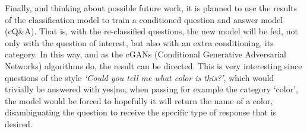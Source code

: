 Finally, and thinking about possible future work, it is planned to use the results of the classification model to train a conditioned question and answer model (cQ\&A). That is, with the re-classified questions, the new model will be fed, not only with the question of interest, but also with an extra conditioning, its category. In this way, and as the cGANs \cite{cGans} (Conditional Generative Adversarial Networks) algorithms do, the result can be directed. This is very interesting since questions of the style \emph{`Could you tell me what color is this?'}, which would trivially be answered with yes|no, when passing for example the category `color', the model would be forced to hopefully it will return the name of a color, disambiguating the question to receive the specific type of response that is desired.